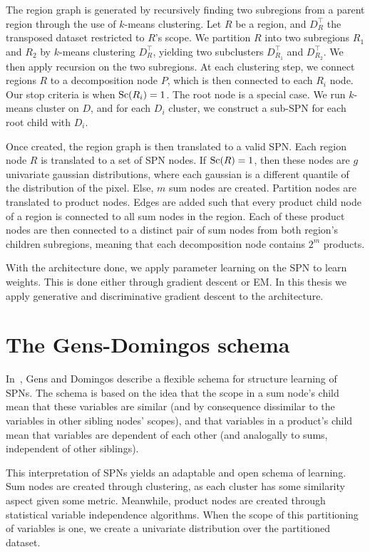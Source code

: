 The region graph is generated by recursively finding two subregions from a parent region through
the use of $k$-means clustering. Let $R$ be a region, and $D_R^\intercal$ the transposed dataset
restricted to $R$'s scope. We partition $R$ into two subregions $R_1$ and $R_2$ by $k$-means
clustering $D_R^\intercal$, yielding two subclusters $D_{R_1}^\intercal$ and $D_{R_2}^\intercal$.
We then apply recursion on the two subregions. At each clustering step, we connect regions $R$ to a
decomposition node $P$, which is then connected to each $R_i$ node. Our stop criteria is when
$\operatorname*{\text{Sc}}(R_i)=1$. The root node is a special case. We run $k$-means cluster on $D$, and for each
$D_i$ cluster, we construct a sub-SPN for each root child with $D_i$.

Once created, the region graph is then translated to a valid SPN\@. Each region node $R$ is
translated to a set of SPN nodes. If $\operatorname*{\text{Sc}}(R)=1$, then these nodes are $g$ univariate gaussian
distributions, where each gaussian is a different quantile of the distribution of the pixel. Else,
$m$ sum nodes are created. Partition nodes are translated to product nodes. Edges are added such
that every product child node of a region is connected to all sum nodes in the region. Each of
these product nodes are then connected to a distinct pair of sum nodes from both region's children
subregions, meaning that each decomposition node contains $2^m$ products.

With the architecture done, we apply parameter learning on the SPN to learn weights. This is done
either through gradient descent or EM\@. In this thesis we apply generative and discriminative
gradient descent to the architecture.

\section{The Gens-Domingos schema}\label{section:gd}

In~\cite{gens-domingos}, Gens and Domingos describe a flexible schema for structure learning of
SPNs. The schema is based on the idea that the scope in a sum node's child mean that these
variables are similar (and by consequence dissimilar to the variables in other sibling nodes'
scopes), and that variables in a product's child mean that variables are dependent of each other
(and analogally to sums, independent of other siblings).

This interpretation of SPNs yields an adaptable and open schema of learning. Sum nodes are created
through clustering, as each cluster has some similarity aspect given some metric. Meanwhile,
product nodes are created through statistical variable independence algorithms. When the scope of
this partitioning of variables is one, we create a univariate distribution over the partitioned
dataset.

